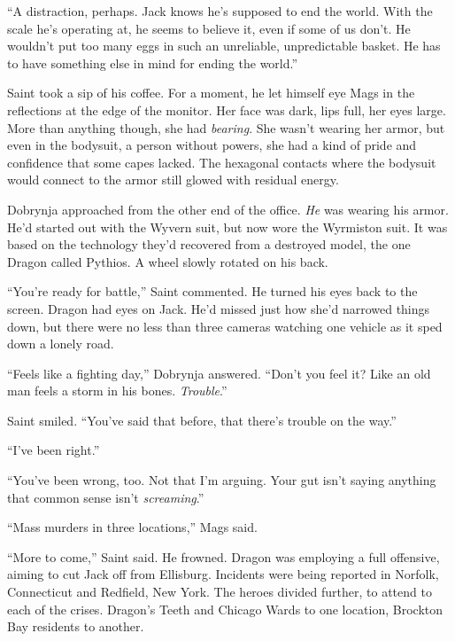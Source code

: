 ``A distraction, perhaps.  Jack knows he's supposed to end the world.  With the scale he's operating at, he seems to believe it, even if some of us don't.  He wouldn't put too many eggs in such an unreliable, unpredictable basket.  He has to have something else in mind for ending the world.''



Saint took a sip of his coffee.  For a moment, he let himself eye Mags in the reflections at the edge of the monitor.  Her face was dark, lips full, her eyes large.  More than anything though, she had \emph{bearing}.  She wasn't wearing her armor, but even in the bodysuit, a person without powers, she had a kind of pride and confidence that some capes lacked.  The hexagonal contacts where the bodysuit would connect to the armor still glowed with residual energy.



Dobrynja approached from the other end of the office.  \emph{He} was wearing his armor.  He'd started out with the Wyvern suit, but now wore the Wyrmiston suit.  It was based on the technology they'd recovered from a destroyed model, the one Dragon called Pythios.  A wheel slowly rotated on his back.



``You're ready for battle,'' Saint commented.  He turned his eyes back to the screen.  Dragon had eyes on Jack.  He'd missed just how she'd narrowed things down, but there were no less than three cameras watching one vehicle as it sped down a lonely road.



``Feels like a fighting day,'' Dobrynja answered.  ``Don't you feel it?  Like an old man feels a storm in his bones.  \emph{Trouble}.''



Saint smiled.  ``You've said that before, that there's trouble on the way.''



``I've been right.''



``You've been wrong, too.  Not that I'm arguing.  Your gut isn't saying anything that common sense isn't \emph{screaming}.''



``Mass murders in three locations,'' Mags said.



``More to come,'' Saint said.  He frowned.  Dragon was employing a full offensive, aiming to cut Jack off from Ellisburg.  Incidents were being reported in Norfolk, Connecticut and Redfield, New York.  The heroes divided further, to attend to each of the crises.  Dragon's Teeth and Chicago Wards to one location, Brockton Bay residents to another.



